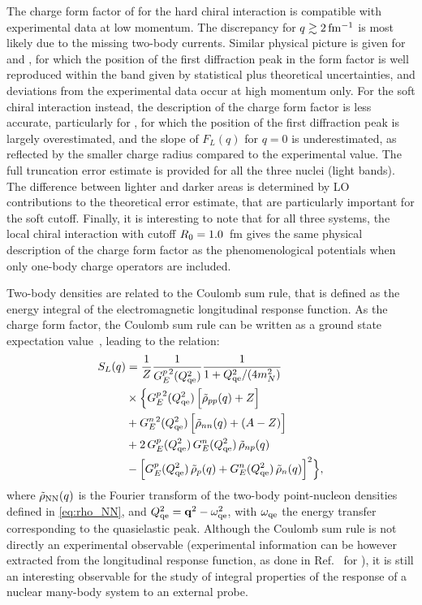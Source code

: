 \documentclass[aps,prc,twocolumn,superscriptaddress,floatfix]{revtex4-1}
\begin{document}
The charge form factor of  for the hard chiral interaction is compatible
with experimental data at low momentum. The discrepancy for $q\gtrsim2\,\rm fm^{-1}$ is most likely
due to the missing two-body currents. Similar physical picture is given for  and
, for which the position of the first diffraction peak in the form factor 
is well reproduced within the band given by statistical plus theoretical uncertainties, 
and deviations from the experimental data occur at high momentum only.
For the soft chiral interaction instead, the description of the charge form factor is less 
accurate, particularly for , for which the position of the first diffraction 
peak is largely overestimated, and the slope of $F_L(q)$ for $q=0$ is underestimated, 
as reflected by the smaller charge radius compared to the experimental value.
The full truncation error estimate is provided for all the three nuclei (light bands). 
The difference between lighter and darker areas is determined by LO contributions 
to the theoretical error estimate, that are particularly important for the soft cutoff.
Finally, it is interesting to note that for all three systems, the local chiral interaction with 
cutoff $R_0=1.0\,\rm$ fm gives the same physical description of the charge form factor as 
the phenomenological potentials when only one-body charge operators are included.

Two-body densities are related to the Coulomb sum rule, that is defined as the energy integral 
of the electromagnetic longitudinal response function. As the charge form factor, the Coulomb sum rule
can be written as a ground state expectation value~\cite{Mcvoy:1962}, leading to the relation:
\begin{align}
	S_L(q)&=\frac{1}{Z} \frac{1}{G_E^{p\,2}(Q_{\rm qe}^2)}\frac{1}{1+Q_{\rm qe}^2/(4 m_N^2)} \nonumber \\
    & \times\Big\{ G_E^{p\,2}(Q_{\rm qe}^2)\,\Big[\tilde{\rho}_{pp}(q)+Z\Big] \nonumber \\
    &        +G_E^{n\,2}(Q_{\rm qe}^2)\,\Big[\tilde{\rho}_{nn}(q)+(A-Z)\Big] \nonumber \\
    &        +2\,G_E^p(Q_{\rm qe}^2)\,G_E^n(Q_{\rm qe}^2)\,\tilde{\rho}_{np}(q) \nonumber \\ 
    & -\Big[G_E^p(Q_{\rm qe}^2)\,\tilde{\rho}_p(q)+G_E^n(Q_{\rm qe}^2)\,\tilde{\rho}_n(q)\Big]^2 \Big\}, 
	\label{eq:sl}
\end{align}
where $\tilde{\rho}_{\rm{NN}}(q)$ is the Fourier transform of the two-body point-nucleon densities defined in \cref{eq:rho_NN},
and $Q^2_{\rm qe}=\vb{q}^2-\omega^2_{\rm qe}$, with $\omega_{\rm qe}$ the energy transfer 
corresponding to the quasielastic peak.
Although the Coulomb sum rule is not directly an experimental observable (experimental information can be however
extracted from the longitudinal response function, as done in Ref.~\cite{Lovato:2016} for ), it is
still an interesting observable for the study of integral properties of the response of a nuclear many-body system to an
external probe.
\end{document}
